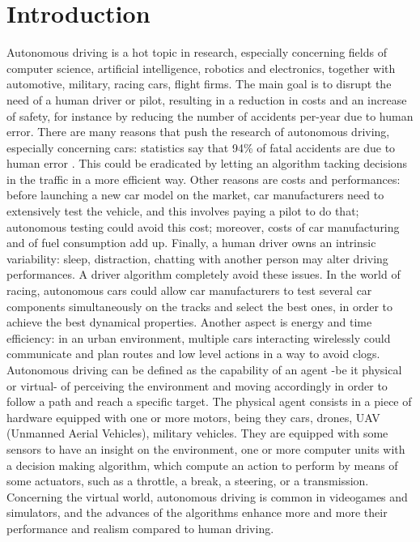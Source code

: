 \chapter{Introduction}
\label{Introduction}
\thispagestyle{empty}




Autonomous driving is a hot topic in research, especially concerning fields of computer science, artificial intelligence, robotics and electronics, together with  automotive, military, racing cars, flight firms. The main goal is to disrupt the need of a human driver or pilot, resulting in a reduction in costs and an increase of safety, for instance by reducing the number of accidents per-year due to human error.
There are many reasons that push the research of autonomous driving, especially concerning cars:
statistics say that 94\% of fatal accidents are due to human error \cite{acc_stat}. This could be eradicated by letting an algorithm tacking decisions in the traffic in a more efficient way.
Other reasons are costs and performances: before launching a new car model on the market, car manufacturers need to extensively test the vehicle, and this involves paying a pilot to do that; autonomous testing could avoid this cost; moreover, costs of car manufacturing and of fuel consumption add up. Finally, a human driver owns an intrinsic variability: sleep, distraction, chatting with another person may alter driving performances. A driver algorithm completely avoid these issues.
In the world of racing, autonomous cars could allow car manufacturers to test several car components simultaneously on the tracks and select the best ones, in order to achieve the best dynamical properties.
Another aspect is energy and time efficiency: in an urban environment, multiple cars interacting wirelessly could communicate and plan routes and low level actions in a way to avoid clogs.
Autonomous driving can be defined as the capability of an agent -be it physical or virtual- of perceiving the environment and moving accordingly in order to follow a path and reach a specific target.
The physical agent consists in a piece of hardware equipped with one or more motors, being they cars, drones, UAV (Unmanned Aerial Vehicles), military vehicles. They are equipped with some sensors to have an insight on the environment, one or more computer units with a decision making algorithm, which compute an action to perform by means of some actuators, such as a throttle, a break, a steering, or a transmission.
Concerning the virtual world, autonomous driving is common in videogames and simulators, and the advances of the algorithms enhance more and more their performance and realism compared to human driving.
